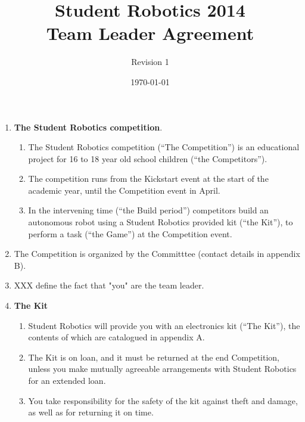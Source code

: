 \documentclass[a4paper, 11pt]{scrartcl}
\title {Student Robotics 2014\\ Team Leader Agreement}
\author{Revision 1}
\date{\today}
\begin{document}
\maketitle

\paragraph{}

\begin{enumerate}

\item \textbf{The Student Robotics competition}.
\begin{enumerate}

\item The Student Robotics competition (``The Competition'') is an educational
project for 16 to 18 year old school children (``the Competitors'').

\item The competition runs from the Kickstart event at the start of the academic
year, until the Competition event in April.

\item In the intervening time (``the Build period'') competitors build an
autonomous robot using a Student Robotics provided kit (``the Kit''), to perform
a task (``the Game'') at the Competition event.
\end{enumerate}

\item The Competition is organized by the Committtee (contact
details in appendix B).

\item XXX define the fact that "you" are the team leader.

\item \textbf{The Kit}\\
\begin{enumerate}

\item Student Robotics will provide you with an electronics kit (``The Kit''),
the contents of which are catalogued in appendix A.

\item The Kit is on loan, and it must be returned at the end Competition,
unless you make mutually agreeable arrangements with Student Robotics for an
extended loan.

\item You take responsibility for the safety of the kit against theft and
damage, as well as for returning it on time.


\end{enumerate}
\end{enumerate}
\end{document}
